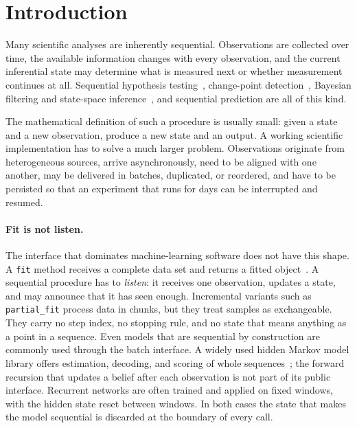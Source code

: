 \documentclass[11pt,a4paper]{article}
\theoremstyle{definition}
\theoremstyle{remark}
\newcommand{\code}[1]{\texttt{#1}}
\begin{document}
\section{Introduction}
\label{sec:introduction}

Many scientific analyses are inherently sequential. Observations are
collected over time, the available information changes with every
observation, and the current inferential state may determine what is
measured next or whether measurement continues at all. Sequential
hypothesis testing~\cite{wald1945,wald1947}, change-point
detection~\cite{page1954,poor2009}, Bayesian filtering and state-space
inference~\cite{kalman1960,sarkka2013}, and sequential prediction are all
of this kind.

The mathematical definition of such a procedure is usually small: given
a state and a new observation, produce a new state and an output. A
working scientific implementation has to solve a much larger problem.
Observations originate from heterogeneous sources, arrive asynchronously,
need to be aligned with one another, may be delivered in batches,
duplicated, or reordered, and have to be persisted so that an experiment
that runs for days can be interrupted and resumed.

\paragraph{Fit is not listen.}
The interface that dominates machine-learning software does not have this
shape. A \code{fit} method receives a complete data set and returns a
fitted object~\cite{buitinck2013}. A sequential procedure has to
\emph{listen}: it receives one observation, updates a state, and may
announce that it has seen enough. Incremental variants such as
\code{partial\_fit} process data in chunks, but they treat samples as
exchangeable. They carry no step index, no stopping rule, and no state
that means anything as a point in a sequence. Even models that are
sequential by construction are commonly used through the batch interface.
A widely used hidden Markov model library offers estimation, decoding,
and scoring of whole sequences~\cite{hmmlearn}; the forward recursion
that updates a belief after each observation is not part of its public
interface. Recurrent networks are often trained and applied on fixed
windows, with the hidden state reset between windows. In both cases the
state that makes the model sequential is discarded at the boundary of
every call.
\end{document}
